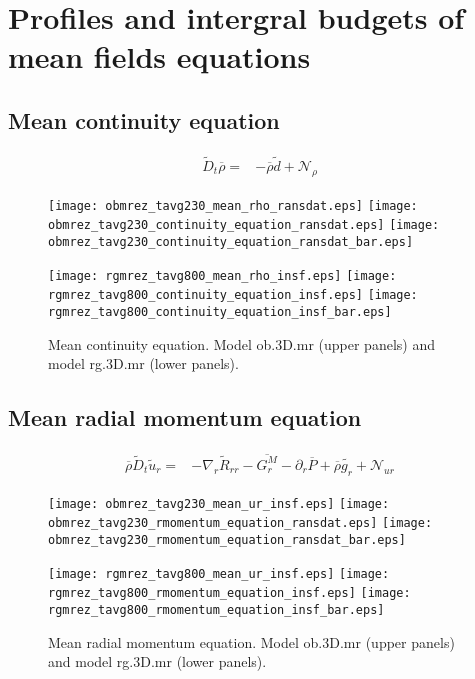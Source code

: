 \documentclass[10pt,paper=a4]{report}
\newcommand{\fav}{\widetilde}
\newcommand{\av}{\overline}
\begin{document}
\clearpage


\section{Profiles and intergral budgets of mean fields equations}

\subsection{Mean continuity equation}

\begin{align}
\fav{D}_t \av{\rho} =& -\av{\rho} \fav{d} + {\mathcal N_\rho}  \label{eq:rans_density}
\end{align}

\begin{figure}[!h]
\centerline{
\texttt{[image: obmrez\_tavg230\_mean\_rho\_ransdat.eps]}
\texttt{[image: obmrez\_tavg230\_continuity\_equation\_ransdat.eps]}
\texttt{[image: obmrez\_tavg230\_continuity\_equation\_ransdat\_bar.eps]}}

\centerline{
\texttt{[image: rgmrez\_tavg800\_mean\_rho\_insf.eps]}
\texttt{[image: rgmrez\_tavg800\_continuity\_equation\_insf.eps]}
\texttt{[image: rgmrez\_tavg800\_continuity\_equation\_insf\_bar.eps]}}
\caption{Mean continuity equation. Model {\sf ob.3D.mr} (upper panels) and model {\sf rg.3D.mr} (lower panels). \label{fig:continuity-equation}}
\end{figure}

\newpage

\subsection{Mean radial momentum equation}

\begin{align}
\av{\rho}\fav{D}_t\fav{u}_r = & -\nabla_r \fav{R}_{rr} -\av{G^{M}_r} - \partial_r \av{P} + \av{\rho}\fav{g_r} + {\mathcal N_{ur}}
\end{align}

\begin{figure}[!h]
\centerline{
\texttt{[image: obmrez\_tavg230\_mean\_ur\_insf.eps]}
\texttt{[image: obmrez\_tavg230\_rmomentum\_equation\_ransdat.eps]}
\texttt{[image: obmrez\_tavg230\_rmomentum\_equation\_ransdat\_bar.eps]}}

\centerline{
\texttt{[image: rgmrez\_tavg800\_mean\_ur\_insf.eps]}
\texttt{[image: rgmrez\_tavg800\_rmomentum\_equation\_insf.eps]}
\texttt{[image: rgmrez\_tavg800\_rmomentum\_equation\_insf\_bar.eps]}}
\caption{Mean radial momentum equation. Model {\sf ob.3D.mr} (upper panels) and model {\sf rg.3D.mr} (lower panels). \label{fig:rm-equation}}
\end{figure}
\end{document}

